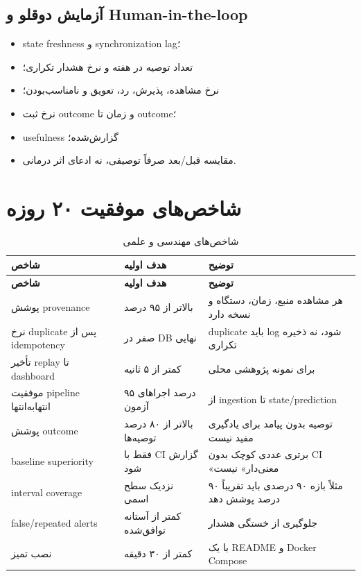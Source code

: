 \documentclass[11pt,a4paper]{article}
\begin{document}
\subsection{آزمایش دوقلو و Human-in-the-loop}
\begin{itemize}
  \item state freshness و synchronization lag؛
  \item تعداد توصیه در هفته و نرخ هشدار تکراری؛
  \item نرخ مشاهده، پذیرش، رد، تعویق و نامناسب‌بودن؛
  \item نرخ ثبت outcome و زمان تا outcome؛
  \item usefulness گزارش‌شده؛
  \item مقایسه قبل/بعد صرفاً توصیفی، نه ادعای اثر درمانی.
\end{itemize}

\section{شاخص‌های موفقیت ۲۰ روزه}

\begin{longtable}{p{}p{}p{}}
\caption{شاخص‌های مهندسی و علمی}\label{tab:kpi}\\
\toprule
\textbf{شاخص} & \textbf{هدف اولیه} & \textbf{توضیح}\\
\midrule
\endfirsthead
\toprule
\textbf{شاخص} & \textbf{هدف اولیه} & \textbf{توضیح}\\
\midrule
\endhead
پوشش provenance & بالاتر از ۹۵ درصد & هر مشاهده منبع، زمان، دستگاه و نسخه دارد\\
نرخ duplicate پس از idempotency & صفر در DB نهایی & duplicate باید log شود، نه ذخیره تکراری\\
تأخیر replay تا dashboard & کمتر از ۵ ثانیه & برای نمونه پژوهشی محلی\\
موفقیت pipeline انتهابه‌انتها & ۹۵ درصد اجراهای آزمون & از ingestion تا state/prediction\\
پوشش outcome & بالاتر از ۸۰ درصد توصیه‌ها & توصیه بدون پیامد برای یادگیری مفید نیست\\
baseline superiority & فقط با CI گزارش شود & برتری عددی کوچک بدون CI «معنی‌دار» نیست\\
interval coverage & نزدیک سطح اسمی & مثلاً بازه ۹۰ درصدی باید تقریباً ۹۰ درصد پوشش دهد\\
false/repeated alerts & کمتر از آستانه توافق‌شده & جلوگیری از خستگی هشدار\\
نصب تمیز & کمتر از ۳۰ دقیقه & با یک README و Docker Compose\\
\bottomrule
\end{longtable}
\end{document}
